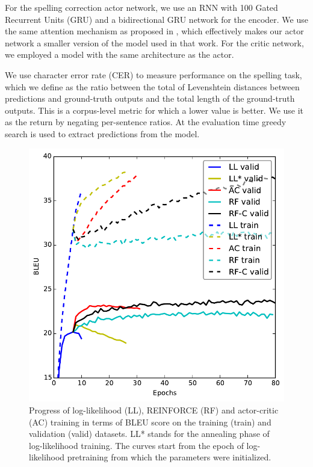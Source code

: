 \documentclass{article} %
\begin{document}
For the spelling correction actor network, we use an RNN with 100 Gated
Recurrent Units (GRU) and a bidirectional GRU network for the encoder. We
use the same attention mechanism as proposed in \citep{bahdanau2015neural},
which effectively makes our actor network a smaller version of the model used
in that work. For the critic network, we employed a model
with the same architecture as the actor. 

We use character error rate (CER) to measure performance on the spelling
task, which we define as the ratio between the total of Levenshtein distances
between predictions and ground-truth outputs and the total length of the
ground-truth outputs. This is a corpus-level metric for which a lower value 
is better. We use it as the return by negating
per-sentence ratios. At the evaluation time greedy search is used to extract
predictions from the model.

\begin{figure}
    \centering
    \includegraphics[scale=0.5]{learning_curves.pdf}
    \caption{Progress of log-likelihood (LL), REINFORCE (RF) and actor-critic (AC) training
        in terms of BLEU score on the training (train) and
        validation (valid) datasets. LL* stands for the annealing phase of log-likelihood training. 
        The curves start from the epoch of log-likelihood
        pretraining from which the parameters were initialized. 
    }
    \label{fig:progress}       
\end{figure}    
\end{document}
